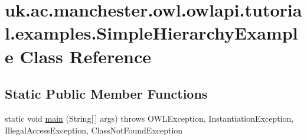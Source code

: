 \hypertarget{classuk_1_1ac_1_1manchester_1_1owl_1_1owlapi_1_1tutorial_1_1examples_1_1_simple_hierarchy_example}{\section{uk.\-ac.\-manchester.\-owl.\-owlapi.\-tutorial.\-examples.\-Simple\-Hierarchy\-Example Class Reference}
\label{classuk_1_1ac_1_1manchester_1_1owl_1_1owlapi_1_1tutorial_1_1examples_1_1_simple_hierarchy_example}
}
\subsection*{Static Public Member Functions}
\begin{DoxyCompactItemize}
\item 
static void \hyperlink{classuk_1_1ac_1_1manchester_1_1owl_1_1owlapi_1_1tutorial_1_1examples_1_1_simple_hierarchy_example_a4d117b256dfbdaf15eee89e8585b3101}{main} (String\mbox{[}$\,$\mbox{]} args)  throws O\-W\-L\-Exception, Instantiation\-Exception,             Illegal\-Access\-Exception, Class\-Not\-Found\-Exception 
\end{DoxyCompactItemize}

